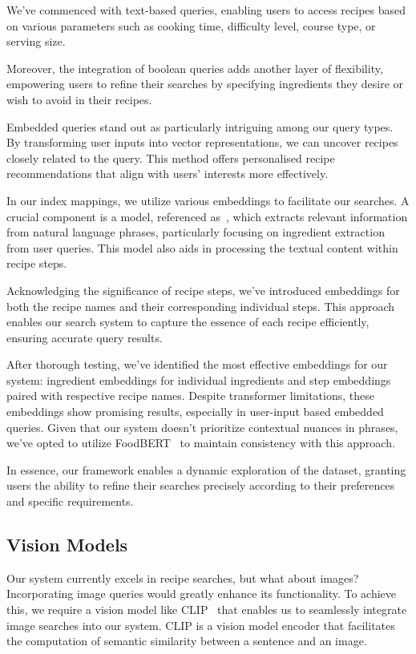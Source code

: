 \documentclass[runningheads]{llncs}
\begin{document}
We've commenced with text-based queries, enabling users to access recipes based on various parameters such as cooking time, difficulty level, course type, or serving size.

Moreover, the integration of boolean queries adds another layer of flexibility, empowering users to refine their searches by specifying ingredients they desire or wish to avoid in their recipes.

Embedded queries stand out as particularly intriguing among our query types. By transforming user inputs into vector representations, we can uncover recipes closely related to the query. This method offers personalised recipe recommendations that align with users' interests more effectively.

In our index mappings, we utilize various embeddings to facilitate our searches. A crucial component is a model, referenced as~\cite{bert}, which extracts relevant information from natural language phrases, particularly focusing on ingredient extraction from user queries. This model also aids in processing the textual content within recipe steps.

Acknowledging the significance of recipe steps, we've introduced embeddings for both the recipe names and their corresponding individual steps. This approach enables our search system to capture the essence of each recipe efficiently, ensuring accurate query results.

After thorough testing, we've identified the most effective embeddings for our system: ingredient embeddings for individual ingredients and step embeddings paired with respective recipe names. Despite transformer limitations, these embeddings show promising results, especially in user-input based embedded queries. Given that our system doesn't prioritize contextual nuances in phrases, we've opted to utilize FoodBERT~\cite{bert} to maintain consistency with this approach.

In essence, our framework enables a dynamic exploration of the dataset, granting users the ability to refine their searches precisely according to their preferences and specific requirements.

\subsection{Vision Models}
Our system currently excels in recipe searches, but what about images? Incorporating image queries would greatly enhance its functionality. To achieve this, we require a vision model like CLIP~\cite{clip} that enables us to seamlessly integrate image searches into our system. CLIP is a vision model encoder that facilitates the computation of semantic similarity between a sentence and an image.
\end{document}
